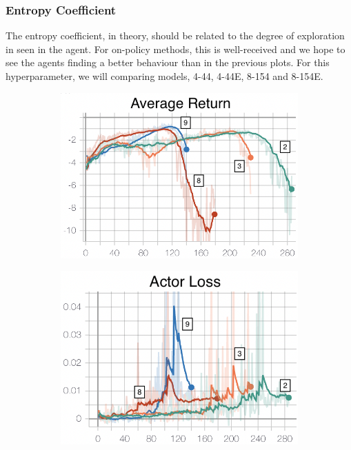 \subsubsection{Entropy Coefficient}
The entropy coefficient, in theory, should be related to the degree of exploration in seen in the agent. For on-policy methods, this is well-received and we hope to see the agents finding a better behaviour than in the previous plots. For this hyperparameter, we will comparing models, 4-44, 4-44E, 8-154 and 8-154E.
\begin{figure}[hbt]
     \centering
     \begin{subfigure}[b]{0.32\textwidth}
         \centering
         \includegraphics[width=\textwidth]{figures/5_/Training/ppo_entcoefAvgReturn.png}
         \caption{}
         \label{fig:5_training_ppo_entcoefAvgReturn}
     \end{subfigure} 
     \hfill
     \begin{subfigure}[b]{0.32\textwidth}
         \centering
         \includegraphics[width=\textwidth]{figures/5_/Training/ppo_entcoefActorL.png}

\end{subfigure}
\end{figure}
